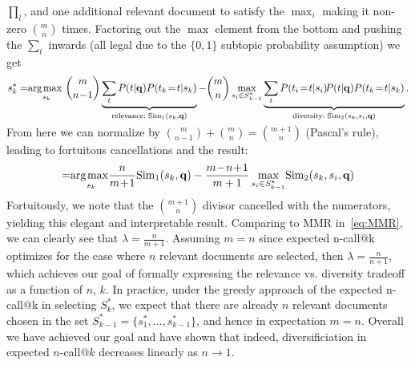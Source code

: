 $\prod_l$, and one additional relevant document to satisfy the
$\max_i$ making it non-zero $\binom{m}{n}$ times.  Factoring out the
$\max$ element from the bottom and pushing the $\sum_t$ inwards (all legal
due to the $\{0,1\}$ subtopic probability assumption) we get
\begin{align}
s_k^* = & \argmax_{s_k} \binom{m}{n\!-\!1} \underbrace{\sum_t P(t|\vec{q}) P(t_k\!=\!t|s_k)}_{\textrm{relevance}: \; \Sim_1(s_k,\vec{q})} - \binom{m}{n} \max_{s_i \in S_{k-1}^*} \underbrace{\sum_t P(t_i\!=\!t|s_i) \!P(t|\vec{q}) P(t_k\!=\!t|s_k)}_{\textrm{diversity}: \; \Sim_2(s_k,s_i,\vec{q})} \nonumber .\\[-7mm] \nonumber
\end{align}  
From here we can 
normalize by $\binom{m}{n-1} + \binom{m}{n} = \binom{m+1}{n}$ 
(Pascal's rule), leading to fortuitous cancellations and the result:
\begin{align}
=  & \argmax_{s_k} \!\! \frac{n}{m\!+\!1} \Sim_1(s_k,\vec{q}) - \frac{m\!-\!n\!+\!1}{m+1} \max_{s_i \in S_{k-1}^*} \! \Sim_2(s_k,s_i,\vec{q}) \nonumber \\[-6mm] \nonumber
\end{align}
Fortuitously, we note that the $\binom{m+1}{n}$ divisor cancelled with
the numerators, yielding this elegant and interpretable result.
Comparing to MMR in~\eqref{eq:MMR}, we can clearly see that $\lambda =
\frac{n}{m\!+\!1}$.  Assuming $m = n$
since expected n-call@k optimizes for the case where $n$ relevant documents are selected, then $\lambda = \frac{n}{n\!+\!1}$, which achieves our goal of formally expressing the relevance vs. diversity tradeoff as a function of $n$, $k$. In practice, under the greedy approach of the expected n-call@k in selecting $S_k^*$, we expect that there are already $n$ relevant documents chosen in the set $S_{k-1}^* = \{s_1^*, \dots, s_{k-1}^*\}$, and hence in expectation $m=n$.
Overall we have achieved our goal and have shown that
indeed, diversificiation in expected $n$-call@$k$ decreases linearly 
as $n \to 1$.



